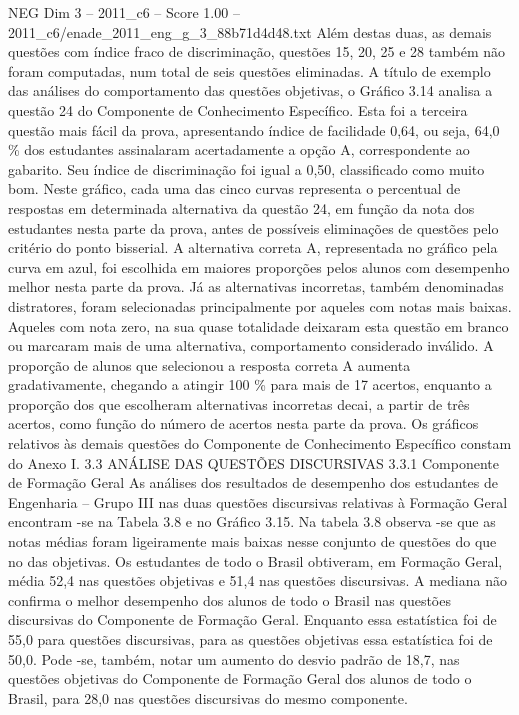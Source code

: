 \begin{textsample}{NEG Dim 3 – 2011\_c6 – Score 1.00 – 2011\_c6/enade\_2011\_eng\_g\_3\_88b71d4d48.txt}
Além destas duas, as demais questões com índice fraco de discriminação, questões 15, 20, 25 e 28 também não foram computadas, num total de seis questões eliminadas.
A título de exemplo das análises do comportamento das questões objetivas, o Gráfico 3.14 analisa a questão 24 do Componente de Conhecimento Específico.
Esta foi a terceira questão mais fácil da prova, apresentando índice de facilidade 0,64, ou seja, 64,0 \% dos estudantes assinalaram acertadamente a opção A, correspondente ao gabarito.
Seu índice de discriminação foi igual a 0,50, classificado como muito bom.
Neste gráfico, cada uma das cinco curvas representa o percentual de respostas em determinada alternativa da questão 24, em função da nota dos estudantes nesta parte da prova, antes de possíveis eliminações de questões pelo critério do ponto bisserial.
A alternativa correta A, representada no gráfico pela curva em azul, foi escolhida em maiores proporções pelos alunos com desempenho melhor nesta parte da prova.
Já as alternativas incorretas, também denominadas distratores, foram selecionadas principalmente por aqueles com notas mais baixas.
Aqueles com nota zero, na sua quase totalidade deixaram esta questão em branco ou marcaram mais de uma alternativa, comportamento considerado inválido.
A proporção de alunos que selecionou a resposta correta A aumenta gradativamente, chegando a atingir 100 \% para mais de 17 acertos, enquanto a proporção dos que escolheram alternativas incorretas decai, a partir de três acertos, como função do número de acertos nesta parte da prova.
Os gráficos relativos às demais questões do Componente de Conhecimento Específico constam do Anexo I. 3.3 ANÁLISE DAS QUESTÕES DISCURSIVAS 3.3.1 Componente de Formação Geral As análises dos resultados de desempenho dos estudantes de Engenharia – Grupo III nas duas questões discursivas relativas à Formação Geral encontram -se na Tabela 3.8 e no Gráfico 3.15.
Na tabela 3.8 observa -se que as notas médias foram ligeiramente mais baixas nesse conjunto de questões do que no das objetivas.
Os estudantes de todo o Brasil obtiveram, em Formação Geral, média 52,4 nas questões objetivas e 51,4 nas questões discursivas.
A mediana não confirma o melhor desempenho dos alunos de todo o Brasil nas questões discursivas do Componente de Formação Geral.
Enquanto essa estatística foi de 55,0 para questões discursivas, para as questões objetivas essa estatística foi de 50,0.
Pode -se, também, notar um aumento do desvio padrão de 18,7, nas questões objetivas do Componente de Formação Geral dos alunos de todo o Brasil, para 28,0 nas questões discursivas do mesmo componente.

\end{textsample}

